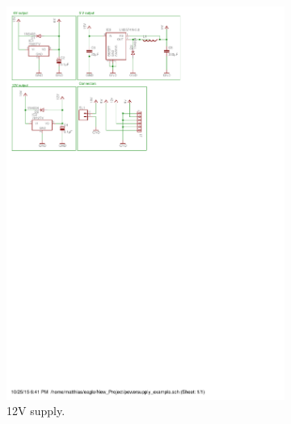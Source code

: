 \begin{figure}[H]
\begin{subfigure}{0.3\linewidth}
\centering
\includegraphics[scale=0.8,trim={0 18.5cm 15.7cm 6.0cm},clip]{img/powersupply.pdf}
\caption{12V supply.}
\label{fig::sch_power_12V}
\end{subfigure}
\begin{subfigure}{0.4\linewidth}
\centering

\end{subfigure}
\end{figure}

